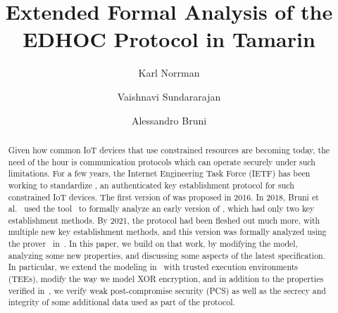 \documentclass[runningheads]{llncs}
\newcommand{\mConstStyle}[1]{\textsf{#1}}
\newcommand{\mProtocolStyle}[1]{\text{#1}}
\newcommand{\mTamarin}{\mProtocolStyle{Tamarin}}
\newcommand{\mProverif}{\mProtocolStyle{ProVerif}}
\newcommand{\mEdhoc}{\mProtocolStyle{EDHOC}}
\newcommand{\mXor}{\mConstStyle{XOR}}
\begin{document}
\title{Extended Formal Analysis of the EDHOC Protocol in Tamarin}
\author{
    Karl Norrman \and
    Vaishnavi Sundararajan \and
    Alessandro Bruni
}

\maketitle
%

\begin{abstract}
Given how common IoT devices that use constrained resources are becoming
today, the need of the hour is communication protocols which can operate
securely under such limitations.
%
For a few years, the Internet Engineering Task Force (IETF) has been working
to standardize \mEdhoc{}, an authenticated key establishment protocol for
such constrained IoT devices.
%
The first version of \mEdhoc{} was proposed in 2016.
%
In 2018, Bruni et al.~\cite{DBLP:conf/secsr/BruniJPS18} used the \mProverif{}
tool~\cite{DBLP:conf/csfw/Blanchet01} to formally analyze an early version of
\mEdhoc{}, which had only two key establishment methods.
%
By 2021, the protocol had been fleshed out much more, with multiple new key
establishment methods, and this version was formally analyzed using the
\mTamarin{} prover~\cite{DBLP:conf/cav/MeierSCB13} in~\cite{Norr21}.
%
In this paper, we build on that work, by modifying the model, analyzing some new properties, and discussing some aspects of the latest \mEdhoc{}
specification. In particular, we extend the modeling in~\cite{Norr21} with trusted execution environments (TEEs), modify the way we model \mXor{} encryption, and in addition to the properties verified in~\cite{Norr21}, we verify weak post-compromise security (PCS) as well as the secrecy and integrity of some additional data used as part of the protocol.


\end{abstract}
%
\end{document}
